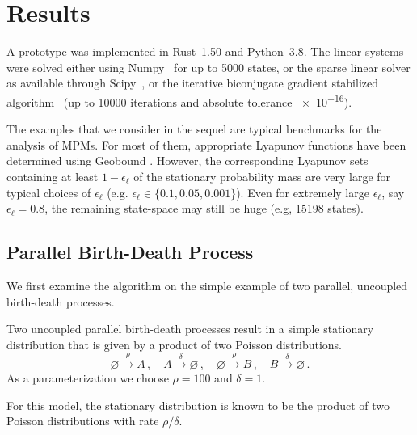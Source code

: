 \section{Results}\label{sec:statagg:results}
A prototype was implemented in Rust~1.50 and Python~3.8.
The linear systems were solved either using Numpy~\parencite{numpy}
for up to \num{5000} states, or the sparse linear solver as available
through Scipy~\parencite{2020SciPy-NMeth}, or the iterative
biconjugate gradient stabilized algorithm~\parencite{van1992bi} (up
to \num{10000} iterations and absolute tolerance \num{e-16}).

The examples that we consider in the sequel
are typical benchmarks for the analysis of \acp{MPM}. For most of
them, appropriate Lyapunov functions
have been determined using Geobound \parencite{geobound,spieler2014numerical}.
However, the corresponding Lyapunov sets containing at least
$1-\epsilon_{\ell}$ of the stationary probability mass are very large
for typical choices of $\epsilon_{\ell}$ (e.g. $\epsilon_{\ell}\in
\{0.1,0.05,0.001\}$). Even
for extremely large $\epsilon_{\ell}$, say $\epsilon_{\ell}=0.8$, the
remaining state-space may still be huge (e.g, \num{15198} states).
\subsection{Parallel Birth-Death Process}
We first examine the algorithm on the simple example of two parallel,
uncoupled birth-death processes.
\begin{model}\label{model:par_bd}
  Two uncoupled parallel birth-death processes result in a simple
  stationary distribution that is
  given by a product of two Poisson distributions.
  \[
    \varnothing\xrightarrow{\rho} A \,,\quad A\xrightarrow{\delta}
    \varnothing \,,\quad
    \varnothing\xrightarrow{\rho} B \,,\quad B\xrightarrow{\delta}
  \varnothing\,.\]
  As a parameterization we choose $\rho = 100$ and $\delta=1$.
\end{model}
For this model, the stationary distribution is known to be the
product of two Poisson distributions with rate $\rho / \delta$.

